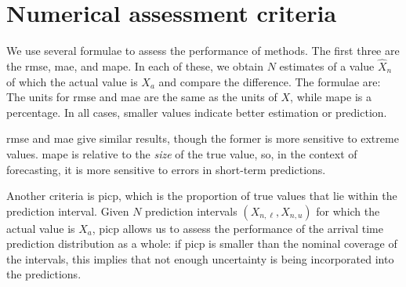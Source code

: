 \chapter{Numerical assessment criteria}
\label{app:error-functions}


We use several formulae to assess the performance of methods. The first three are the \gls{rmse}, \gls{mae}, and \gls{mape}. In each of these, we obtain $N$ estimates of a value $\hat X_n$ of which the actual value is $X_a$ and compare the difference. The formulae are:
The units for \gls{rmse} and \gls{mae} are the same as the units of $X$, while \gls{mape} is a percentage. In all cases, smaller values indicate better estimation or prediction.


\Gls{rmse} and \gls{mae} give similar results, though the former is more sensitive to extreme values. \gls{mape} is relative to the \emph{size} of the true value, so, in the context of forecasting, it is more sensitive to errors in short-term predictions.

Another criteria is \gls{picp}, which is the proportion of true values that lie within the prediction interval. Given $N$ prediction intervals $(X_{n,\ell}, X_{n,u})$ for which the actual value is $X_a$,
\Gls{picp} allows us to assess the performance of the arrival time prediction distribution as a whole: if \gls{picp} is smaller than the nominal coverage of the intervals, this implies that not enough uncertainty is being incorporated into the predictions.



